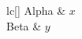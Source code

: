 \documentclass{article}
\begin{document}
\begin{NiceTabular}[]{lc}[]
Alpha & $x$ \\ Beta & $y$
\end{NiceTabular}
\end{document}
